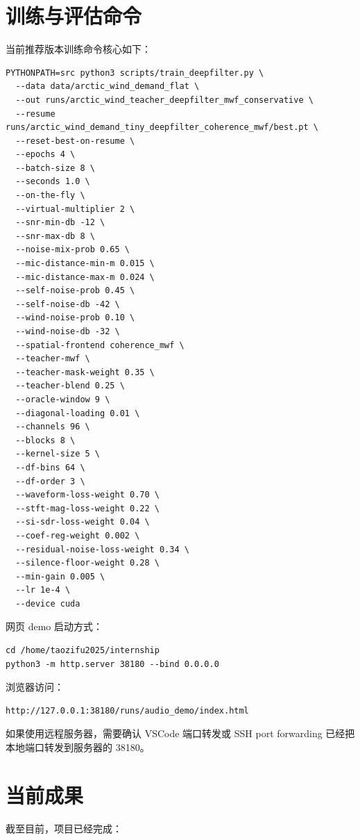 \documentclass[UTF8,12pt,a4paper]{ctexart}
\begin{document}
\section{训练与评估命令}

当前推荐版本训练命令核心如下：

\begin{lstlisting}
PYTHONPATH=src python3 scripts/train_deepfilter.py \
  --data data/arctic_wind_demand_flat \
  --out runs/arctic_wind_teacher_deepfilter_mwf_conservative \
  --resume runs/arctic_wind_demand_tiny_deepfilter_coherence_mwf/best.pt \
  --reset-best-on-resume \
  --epochs 4 \
  --batch-size 8 \
  --seconds 1.0 \
  --on-the-fly \
  --virtual-multiplier 2 \
  --snr-min-db -12 \
  --snr-max-db 8 \
  --noise-mix-prob 0.65 \
  --mic-distance-min-m 0.015 \
  --mic-distance-max-m 0.024 \
  --self-noise-prob 0.45 \
  --self-noise-db -42 \
  --wind-noise-prob 0.10 \
  --wind-noise-db -32 \
  --spatial-frontend coherence_mwf \
  --teacher-mwf \
  --teacher-mask-weight 0.35 \
  --teacher-blend 0.25 \
  --oracle-window 9 \
  --diagonal-loading 0.01 \
  --channels 96 \
  --blocks 8 \
  --kernel-size 5 \
  --df-bins 64 \
  --df-order 3 \
  --waveform-loss-weight 0.70 \
  --stft-mag-loss-weight 0.22 \
  --si-sdr-loss-weight 0.04 \
  --coef-reg-weight 0.002 \
  --residual-noise-loss-weight 0.34 \
  --silence-floor-weight 0.28 \
  --min-gain 0.005 \
  --lr 1e-4 \
  --device cuda
\end{lstlisting}

网页 demo 启动方式：

\begin{lstlisting}
cd /home/taozifu2025/internship
python3 -m http.server 38180 --bind 0.0.0.0
\end{lstlisting}

浏览器访问：

\begin{lstlisting}
http://127.0.0.1:38180/runs/audio_demo/index.html
\end{lstlisting}

如果使用远程服务器，需要确认 VSCode 端口转发或 SSH port forwarding 已经把本地端口转发到服务器的 38180。

\section{当前成果}

截至目前，项目已经完成：
\end{document}
